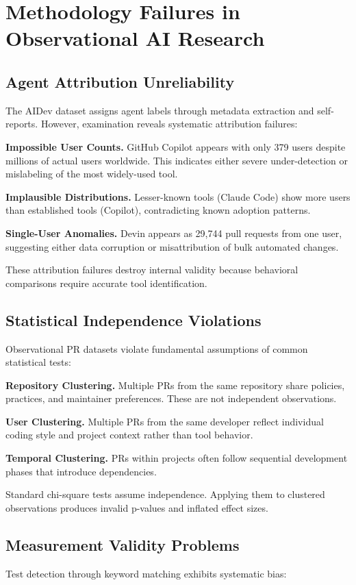 \documentclass[conference]{IEEEtran}
\begin{document}
\section{Methodology Failures in Observational AI Research}

\subsection{Agent Attribution Unreliability}
The AIDev dataset assigns agent labels through metadata extraction and self-reports. However, examination reveals systematic attribution failures:

\textbf{Impossible User Counts.} GitHub Copilot appears with only 379 users despite millions of actual users worldwide. This indicates either severe under-detection or mislabeling of the most widely-used tool.

\textbf{Implausible Distributions.} Lesser-known tools (Claude Code) show more users than established tools (Copilot), contradicting known adoption patterns.

\textbf{Single-User Anomalies.} Devin appears as 29,744 pull requests from one user, suggesting either data corruption or misattribution of bulk automated changes.

These attribution failures destroy internal validity because behavioral comparisons require accurate tool identification.

\subsection{Statistical Independence Violations}
Observational PR datasets violate fundamental assumptions of common statistical tests:

\textbf{Repository Clustering.} Multiple PRs from the same repository share policies, practices, and maintainer preferences. These are not independent observations.

\textbf{User Clustering.} Multiple PRs from the same developer reflect individual coding style and project context rather than tool behavior.

\textbf{Temporal Clustering.} PRs within projects often follow sequential development phases that introduce dependencies.

Standard chi-square tests assume independence. Applying them to clustered observations produces invalid p-values and inflated effect sizes.

\subsection{Measurement Validity Problems}
Test detection through keyword matching exhibits systematic bias:
\end{document}
